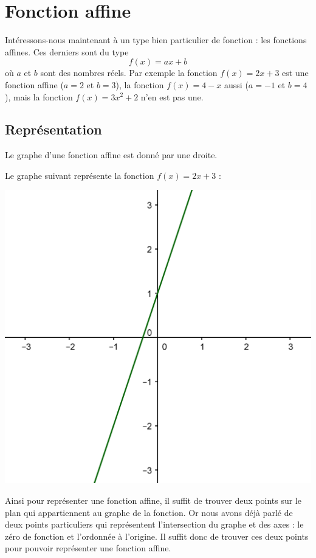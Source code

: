 \section{Fonction affine} \label{fct_affine}

Intéressons-nous maintenant à un type bien particulier de fonction : les fonctions affines. Ces derniers sont du type 
$$
f(x) = ax + b
$$
où $a$ et $b$ sont des nombres réels. Par exemple la fonction $f(x) = 2x + 3$ est une fonction affine ($a=2$ et $b=3$), la fonction $f(x) = 4-x$ aussi ($a=-1$ et $b=4$), mais la fonction $f(x) = 3x^2 + 2$ n'en est pas une.

\subsection{Représentation}

Le graphe d'une fonction affine est donné par une droite.

\begin{exemple}
Le graphe suivant représente la fonction $f(x) = 2x+3$ :
\begin{center}
\includegraphics{affines/fct_affine.png}
\end{center}
\end{exemple}

Ainsi pour représenter une fonction affine, il suffit de trouver deux points sur le plan qui appartiennent au graphe de la fonction. Or nous avons déjà parlé de deux points particuliers qui représentent l'intersection du graphe et des axes : le zéro de fonction et l'ordonnée à l'origine. Il suffit donc de trouver ces deux points pour pouvoir représenter une fonction affine.

